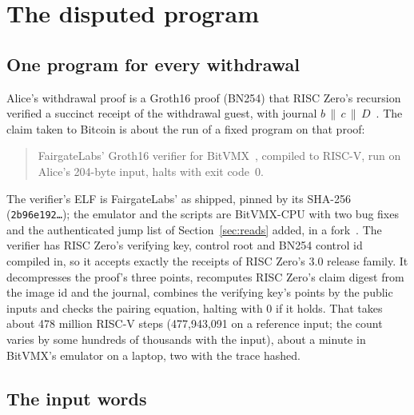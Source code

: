 \documentclass[11pt]{article}
\begin{document}
\section{The disputed program}
\label{sec:program}

\subsection{One program for every withdrawal}

Alice's withdrawal proof is a Groth16 proof (BN254) that RISC Zero's
recursion verified a succinct receipt of the withdrawal guest, with
journal $b \,\|\, c \,\|\, D$~\cite{pipeline}. The claim taken to Bitcoin
is about the run of a fixed program on that proof:
\begin{quote}
FairgateLabs' Groth16 verifier for BitVMX~\cite{bitvmxcpu}, compiled to
RISC-V, run on Alice's 204-byte input, halts with exit code~0.
\end{quote}
The verifier's ELF is FairgateLabs' as shipped, pinned by its SHA-256
(\texttt{2b96e192\ldots}); the emulator and the scripts are BitVMX-CPU
with two bug fixes and the authenticated jump list of
Section~\ref{sec:reads} added, in a fork~\cite{bitvmxfork}. The verifier
has RISC Zero's verifying key, control root and BN254 control id
compiled in, so it accepts exactly the receipts of RISC Zero's 3.0
release family. It decompresses the proof's three points, recomputes
RISC Zero's claim digest from the image id and the journal, combines the
verifying key's points by the public inputs and checks the pairing
equation, halting with 0 if it holds. That takes about 478 million
RISC-V steps (477,943,091 on a reference input; the count varies by some
hundreds of thousands with the input), about a minute in BitVMX's
emulator on a laptop, two with the trace hashed.

\subsection{The input words}
\end{document}
